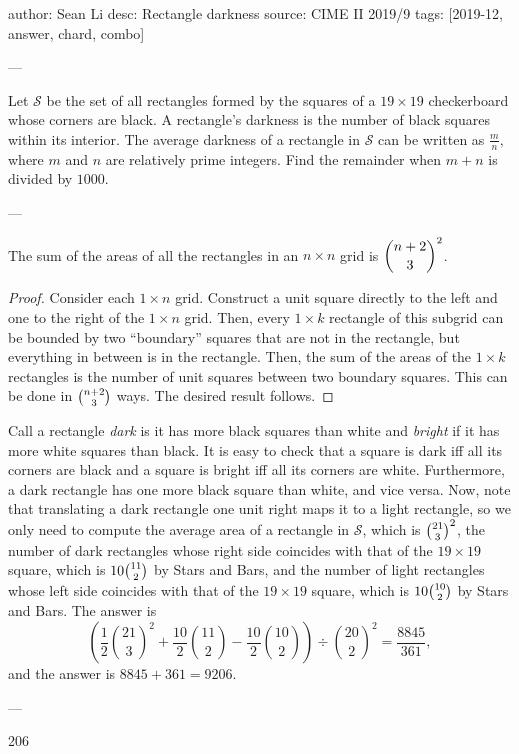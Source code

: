 author: Sean Li
desc: Rectangle darkness
source: CIME II 2019/9
tags: [2019-12, answer, chard, combo]

---

Let $\mathcal{S}$ be the set of all rectangles formed by the squares of a $19 \times 19$ checkerboard whose corners are black$.$ A rectangle's darkness is the number of black squares within its interior$.$ The average darkness of a rectangle in $\mathcal{S}$ can be written as $\tfrac mn,$ where  $m$ and $n$ are relatively prime integers$.$ Find the remainder when $m+n$ is divided by $1000$.

---

\begin{lemma*}
    The sum of the areas of all the rectangles in an $n\times n$ grid is $\dbinom{n+2}3^2$.
\end{lemma*}
\begin{proof}
    Consider each $1\times n$ grid. Construct a unit square directly to the left and one to the right of the $1\times n$ grid. Then, every $1\times k$ rectangle of this subgrid can be bounded by two ``boundary'' squares that are not in the rectangle, but everything in between is in the rectangle. Then, the sum of the areas of the $1\times k$ rectangles is the number of unit squares between two boundary squares. This can be done in $\tbinom{n+2}3$ ways. The desired result follows.
\end{proof}

Call a rectangle \textit{dark} is it has more black squares than white and \textit{bright} if it has more white squares than black. It is easy to check that a square is dark iff all its corners are black and a square is bright iff all its corners are white. Furthermore, a dark rectangle has one more black square than white, and vice versa. Now, note that translating a dark rectangle one unit right maps it to a light rectangle, so we only need to compute the average area of a rectangle in $\mathcal{S}$, which is $\tbinom{21}3^2$, the number of dark rectangles whose right side coincides with that of the $19\times 19$ square, which is $10\tbinom{11}2$ by Stars and Bars, and the number of light rectangles whose left side coincides with that of the $19\times 19$ square, which is $10\tbinom{10}2$ by Stars and Bars. The answer is \[\left(\frac12\binom{21}3^2+\frac{10}2\binom{11}2-\frac{10}2\binom{10}2\right)\div\binom{20}2^2=\frac{8845}{361},\]
and the answer is $8845+361=9206$.

---

206
